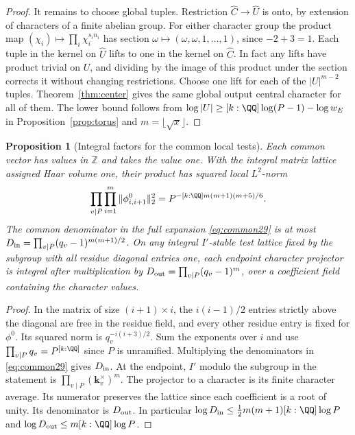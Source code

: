 \documentclass[a4paper,11pt]{article}
\newtheorem{proposition}{Proposition}[section]
\theoremstyle{definition}
\theoremstyle{remark}
\newcommand{\ZZ}{\mathbb Z}\newcommand{\ord}{\operatorname{ord}}
\numberwithin{equation}{section}
\begin{document}
\begin{proof}
It remains to choose global tuples. Restriction \(\widehat C\to\widehat U\) is onto, by extension of characters of a finite abelian group. For either character group the product map \((\chi_i)\mapsto\prod_i\chi_i^{s_i n_i}\) has section \(\omega\mapsto(\omega,\omega,1,\ldots,1)\), since \(-2+3=1\). Each tuple in the kernel on \(\widehat U\) lifts to one in the kernel on \(\widehat C\). In fact any lifts have product trivial on \(U\), and dividing by the image of this product under the section corrects it without changing restrictions. Choose one lift for each of the \(|U|^{m-2}\) tuples. Theorem~\ref{thm:center} gives the same global output central character for all of them. The lower bound follows from \(\log|U|\ge [k:\QQ]\log(P-1)-\log w_E\) in Proposition~\ref{prop:torus} and \(m=\lfloor\sqrt{x}\rfloor\).
\end{proof}

\begin{proposition}[Integral factors for the common local tests]\label{prop:int29}
Each common vector has values in \(\ZZ\) and takes the value one. With the integral matrix lattice assigned Haar volume one, their product has squared local \(L^2\)-norm
\[
    \prod_{v\mid P}\prod_{i=1}^m\|\phi^0_{i,i+1}\|_2^2
       =P^{-[k:\QQ]m(m+1)(m+5)/6}.
\]
The common denominator in the full expansion \eqref{eq:common29} is at most
\(D_{\rm in}=\prod_{v\mid P}(q_v-1)^{m(m+1)/2}\).
On any integral \(I'\)-stable test lattice fixed by the subgroup with all residue diagonal entries one, each endpoint character projector is integral after multiplication by
\(D_{\rm out}=\prod_{v\mid P}(q_v-1)^m\), over a coefficient field containing the character values.
\end{proposition}
\begin{proof}
In the matrix of size \((i+1)\times i\), the \(i(i-1)/2\) entries strictly above the diagonal are free in the residue field, and every other residue entry is fixed for \(\phi^0\). Its squared norm is \(q_v^{-i(i+3)/2}\). Sum the exponents over \(i\) and use \(\prod_{v\mid P}q_v=P^{[k:\QQ]}\) since \(P\) is unramified. Multiplying the denominators in \eqref{eq:common29} gives \(D_{\rm in}\). At the endpoint, \(I'\) modulo the subgroup in the statement is \(\prod_{v\mid P}(\mathbf k_v^\times)^m\). The projector to a character is its finite character average. Its numerator preserves the lattice since each coefficient is a root of unity. Its denominator is \(D_{\rm out}\). In particular \(\log D_{\rm in}\le \tfrac12 m(m+1)[k:\QQ]\log P\) and \(\log D_{\rm out}\le m[k:\QQ]\log P\).
\end{proof}
\end{document}
